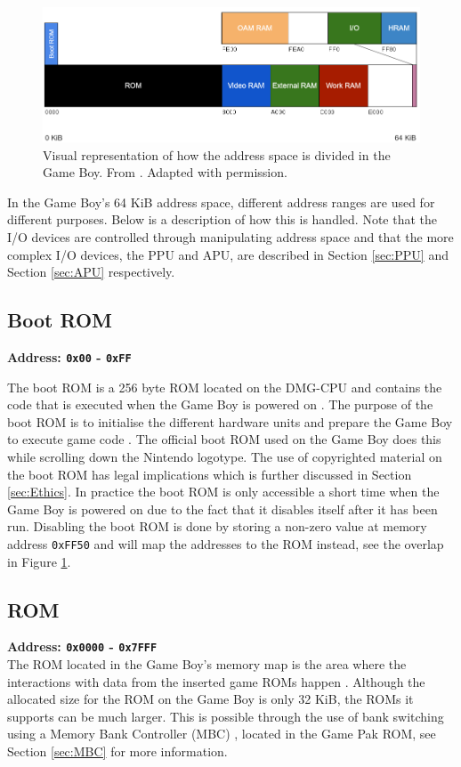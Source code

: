 \begin{figure}[H]
    \centering
    \includegraphics[width=\textwidth]{figures/Memory Map.PNG}
    \caption{Visual representation of how the address space is divided in the Game Boy. From \cite{ultimateGBtalkSlides}. Adapted with permission.}
    \label{fig:memory-map}
\end{figure}
In the Game Boy's 64 KiB address space, different address ranges are used for different purposes. Below is a description of how this is handled. Note that the I/O devices are controlled through manipulating address space and that the more complex I/O devices, the PPU and APU, are described in Section \ref{sec:PPU} and Section \ref{sec:APU} respectively.

\subsection{Boot ROM}
\textbf{Address: \texttt{0x00} - \texttt{0xFF}}

The boot ROM is a 256 byte ROM located on the DMG-CPU and contains the code that is executed when the Game Boy is powered on \cite{BootRom}. The purpose of the boot ROM is to initialise the different hardware units and prepare the Game Boy to execute game code \cite{bootstraptechopedia}. The official boot ROM used on the Game Boy does this while scrolling down the Nintendo logotype. The use of copyrighted material on the boot ROM has legal implications which is further discussed in Section \ref{sec:Ethics}.
In practice the boot ROM is only accessible a short time when the Game Boy is powered on due to the fact that it disables itself after it has been run. 
Disabling the boot ROM is done by storing a non-zero value at memory address \texttt{0xFF50} and will map the addresses to the ROM instead, see the overlap in Figure \ref{fig:memory-map}.
\newpage
\subsection{ROM}
\textbf{Address: \texttt{0x0000} - \texttt{0x7FFF}}
\\
The ROM located in the Game Boy's memory map is the area where the interactions with data from the inserted game ROMs happen \cite{pandocsmemorymap}. 
Although the allocated size for the ROM on the Game Boy is only 32 KiB, the ROMs it supports can be much larger. This is possible through the use of bank switching using a Memory Bank Controller (MBC) \cite{pandocsexternalmemoryandhardware}, located in the Game Pak ROM, see Section \ref{sec:MBC} for more information.

